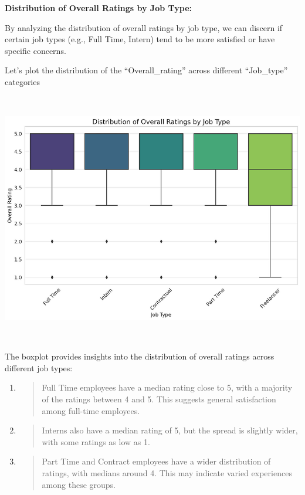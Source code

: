 \documentclass[
]{article}
\begin{document}
\textbf{Distribution of Overall Ratings by Job Type:}

By analyzing the distribution of overall ratings by job type, we can
discern if certain job types (e.g., Full Time, Intern) tend to be more
satisfied or have specific concerns.

Let's plot the distribution of the ``Overall\_rating'' across different
``Job\_type'' categories

\includegraphics[width=5.26806in,height=4.33403in]{image8.png}

The boxplot provides insights into the distribution of overall ratings
across different job types:

\begin{enumerate}
\def\labelenumi{\arabic{enumi}.}
\item
  \begin{quote}
  Full Time employees have a median rating close to 5, with a majority
  of the ratings between 4 and 5. This suggests general satisfaction
  among full-time employees.
  \end{quote}
\item
  \begin{quote}
  Interns also have a median rating of 5, but the spread is slightly
  wider, with some ratings as low as 1.
  \end{quote}
\item
  \begin{quote}
  Part Time and Contract employees have a wider distribution of ratings,
  with medians around 4. This may indicate varied experiences among
  these groups.
  \end{quote}
\end{enumerate}
\end{document}
